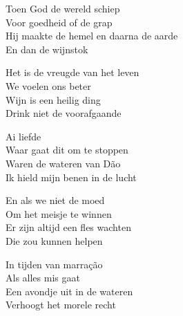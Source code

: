 \begin{translation}
Toen God de wereld schiep\\
Voor goedheid of de grap\\
Hij maakte de hemel en daarna de aarde\\
En dan de wijnstok\vspace{\wlskip}

Het is de vreugde van het leven\\
We voelen ons beter\\
Wijn is een heilig ding\\
Drink niet de voorafgaande\vspace{\wlskip}

Ai liefde\\
Waar gaat dit om te stoppen\\
Waren de wateren van Dão\\
Ik hield mijn benen in de lucht\vspace{\wlskip}

En als we niet de moed\\
Om het meisje te winnen\\
Er zijn altijd een fles wachten\\
Die zou kunnen helpen\vspace{\wlskip}

In tijden van marração\\
Als alles mis gaat\\
Een avondje uit in de wateren\\
Verhoogt het morele recht
\end{translation}
